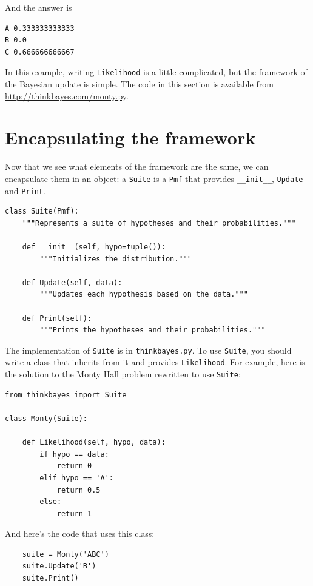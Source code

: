 \documentclass[12pt]{book}
\begin{document}
And the answer is

\begin{verbatim}
A 0.333333333333
B 0.0
C 0.666666666667
\end{verbatim}

In this example, writing \verb"Likelihood" is a little complicated,
but the framework of the Bayesian update is simple.  The code in
this section is available from \url{http://thinkbayes.com/monty.py}.


\section{Encapsulating the framework}

Now that we see what elements of the framework are the same, we
can encapsulate them in an object: a \verb"Suite" is a \verb"Pmf"
that provides \verb"__init__", \verb"Update" and \verb"Print".

\begin{verbatim}
class Suite(Pmf):
    """Represents a suite of hypotheses and their probabilities."""

    def __init__(self, hypo=tuple()):
        """Initializes the distribution."""

    def Update(self, data):
        """Updates each hypothesis based on the data."""

    def Print(self):
        """Prints the hypotheses and their probabilities."""
\end{verbatim}

The implementation of \verb"Suite" is in \verb"thinkbayes.py".  To use
\verb"Suite", you should write a class that inherits from it and
provides \verb"Likelihood".  For example, here is the solution to the
Monty Hall problem rewritten to use \verb"Suite":

\begin{verbatim}
from thinkbayes import Suite

class Monty(Suite):

    def Likelihood(self, hypo, data):
        if hypo == data:
            return 0
        elif hypo == 'A':
            return 0.5
        else:
            return 1
\end{verbatim}

And here's the code that uses this class:

\begin{verbatim}
    suite = Monty('ABC')
    suite.Update('B')
    suite.Print()
\end{verbatim}
\end{document}
